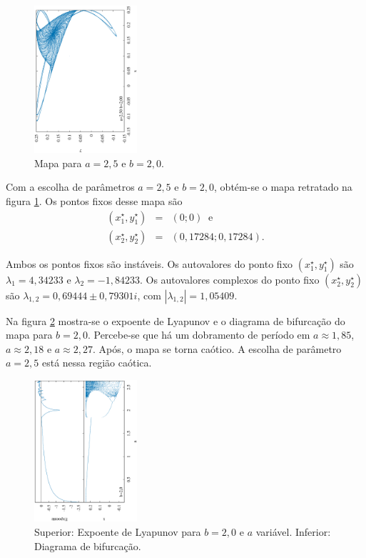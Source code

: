 \documentclass[brazilian, 12pt, a4paper, final]{article}
\begin{document}
\begin{multicols*}{2}
\begin{figure}[H] 
  \centering
  \includegraphics[width=0.34\textwidth,angle=-90]{mapa_a250_b200.eps}
  \caption{Mapa para $a=2,5$ e $b=2,0$.}
  \label{fig:250}
\end{figure}

Com a escolha de parâmetros $a=2,5$ e $b=2,0$, obtém-se o mapa retratado na figura \ref{fig:250}. Os pontos fixos desse mapa são 
\begin{eqnarray}
	\nonumber (x^{\star}_1,y^{\star}_1)&=&(0; 0) \;\; \mathrm{e} \\
	\nonumber (x^{\star}_2,y^{\star}_2)&=&(0,17284; 0,17284).
\end{eqnarray}

Ambos os pontos fixos são instáveis. Os autovalores do ponto fixo $(x^{\star}_1,y^{\star}_1)$ são	$\lambda_1=4,34233$ e $\lambda_2=-1,84233$. Os autovalores complexos do ponto fixo $(x^{\star}_2,y^{\star}_2)$ são $\lambda_{1,2}=0,69444\pm 0,79301i$, com $|\lambda_{1,2}|=1,05409$.

Na figura \ref{fig:20} mostra-se o expoente de Lyapunov e o diagrama de bifurcação do mapa para $b=2,0$. Percebe-se que há um dobramento de período em $a\approx1,85$, $a\approx2,18$ e $a\approx2,27$. Após, o mapa se torna caótico. A escolha de parâmetro $a=2,5$ está nessa região caótica.

\begin{figure}[H] 
  \centering
  \includegraphics[width=0.34\textwidth,angle=-90]{lyapunov_a00_b20.eps}
  \caption{Superior: Expoente de Lyapunov para $b=2,0$ e $a$ variável. Inferior: Diagrama de bifurcação.}
  \label{fig:20}
\end{figure}




\end{multicols*}
\end{document}
